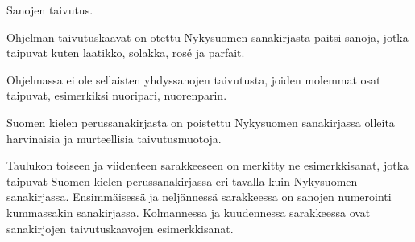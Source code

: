 Sanojen taivutus.

Ohjelman taivutuskaavat on otettu Nykysuomen sanakirjasta paitsi
sanoja, jotka taipuvat kuten laatikko, solakka, rosé ja parfait.

Ohjelmassa ei ole sellaisten yhdyssanojen taivutusta, joiden
molemmat osat taipuvat, esimerkiksi nuoripari, nuorenparin.

Suomen kielen perussanakirjasta on poistettu Nykysuomen sanakirjassa
olleita harvinaisia ja murteellisia taivutusmuotoja.

Taulukon toiseen ja viidenteen sarakkeeseen on merkitty ne
esimerkkisanat, jotka taipuvat Suomen kielen perussanakirjassa eri
tavalla kuin Nykysuomen sanakirjassa. Ensimmäisessä ja neljännessä
sarakkeessa on sanojen numerointi kummassakin sanakirjassa.
Kolmannessa ja kuudennessa sarakkeessa ovat sanakirjojen
taivutuskaavojen esimerkkisanat.


